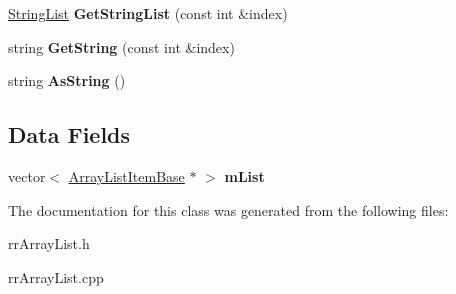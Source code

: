 \begin{DoxyCompactItemize}
\item 
\hypertarget{classrrc_1_1_array_list_a0d713d8ec0ca7a64280381f7cf4f5519}{\hyperlink{classrrc_1_1_string_list}{String\+List} {\bfseries Get\+String\+List} (const int \&index)}\label{classrrc_1_1_array_list_a0d713d8ec0ca7a64280381f7cf4f5519}

\item 
\hypertarget{classrrc_1_1_array_list_a5d5c7bbe7e47d8a8f91911a7bcd4636d}{string {\bfseries Get\+String} (const int \&index)}\label{classrrc_1_1_array_list_a5d5c7bbe7e47d8a8f91911a7bcd4636d}

\item 
\hypertarget{classrrc_1_1_array_list_afb0cb51aaa92f311621daed306530e97}{string {\bfseries As\+String} ()}\label{classrrc_1_1_array_list_afb0cb51aaa92f311621daed306530e97}

\end{DoxyCompactItemize}
\subsection*{Data Fields}
\begin{DoxyCompactItemize}
\item 
\hypertarget{classrrc_1_1_array_list_a7825d7740ce9e23ba3f867189698155e}{vector$<$ \hyperlink{classrrc_1_1_array_list_item_base}{Array\+List\+Item\+Base} $\ast$ $>$ {\bfseries m\+List}}\label{classrrc_1_1_array_list_a7825d7740ce9e23ba3f867189698155e}

\end{DoxyCompactItemize}


The documentation for this class was generated from the following files\+:\begin{DoxyCompactItemize}
\item 
rr\+Array\+List.\+h\item 
rr\+Array\+List.\+cpp\end{DoxyCompactItemize}
